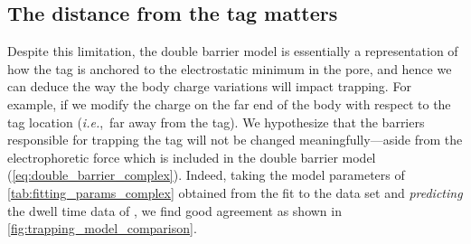 \begin{figure*}[p]
  \caption[Effect of body and tag charge on the dwell time of {DHFR}.]
  {%
    \textbf{Effect of body and tag charge on the dwell time of {DHFR}.}
    () Predicted dwell times of the body charge variations
     by \cref{eq:double_barrier} and using the parameters in
    \cref{tab:fitting_params_complex}. Clearly, the location of the body charge plays an important, but
    uncaptured, role in determining the dwell time of \gls{dhfr}.
    ()
    and
    ()
    are the voltage dependencies of the mean dwell time ($\dwelltime$) for several tag charge variants of
    , fitted with the simple barrier model of \cref{eq:double_barrier_simple} and the full
    double barrier model of \cref{eq:double_barrier_complex}, respectively. The annotated threshold voltages
    for () and
    () were computed by respectively
    \cref{eq:threshold_voltage_simple} and \cref{eq:threshold_voltage_complex}. Solid lines represent the
    double barrier dwell time while the dotted lines show the dwell times due the \cisi{} (low to high) and
    \transi{} (high to low) barriers. Fitting parameters can be found in \cref{tab:fitting_parameters_simple}.
    }\label{fig:trapping_model_comparison}
\end{figure*}
%


\subsection{The distance from the tag matters}
%

Despite this limitation, the double barrier model is essentially a representation of how the tag is anchored
to the electrostatic minimum in the pore, and hence we can deduce the way the body charge variations will
impact trapping. For example, if we modify the charge on the far end of the body with respect to the tag
location (\textit{i.e.},~far away from the tag). We hypothesize that the barriers responsible for trapping the
tag will not be changed meaningfully---aside from the electrophoretic force which is included in the double
barrier model (\cref{eq:double_barrier_complex}). Indeed, taking the model parameters of
\cref{tab:fitting_params_complex} obtained from the fit to the  data set and
\emph{predicting} the dwell time data of , we find good agreement as shown in
\cref{fig:trapping_model_comparison}.

